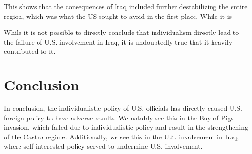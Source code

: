 \documentclass[12pt]{article}
\begin{document}
        This shows that the consequences of Iraq included further destabilizing the entire region, which was what the US sought to avoid in the first place. While it is 

        While it is not possible to directly conclude that individualism directly lead to the failure of U.S. involvement in Iraq, it is undoubtedly true that it heavily contributed to it. 
        
\section{Conclusion}
        In conclusion, the individualistic policy of U.S. officials has directly caused U.S. foreign policy to have adverse results. We notably see this in the Bay of Pigs invasion, which failed due to individualistic policy and result in the strengthening of the Castro regime. Additionally, we see this in the U.S. involvement in Iraq, where self-interested policy served to undermine U.S. involvement.


\pagebreak

\printbibliography[heading=bibintoc]
\end{document}
